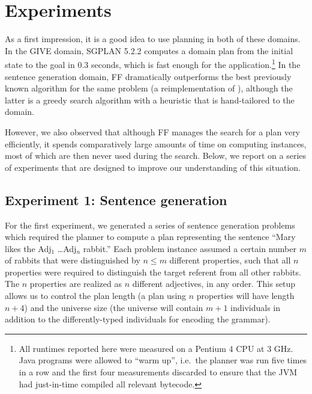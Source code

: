 \section{Experiments} \label{sec:experiments}

As a first impression, it is a good idea to use planning in both of
these domains.  In the GIVE domain, SGPLAN 5.2.2 computes a domain
plan from the initial state to the goal in 0.3 seconds, which is fast
enough for the application.\footnote{All runtimes reported here were
  measured on a Pentium 4 CPU at 3 GHz.  Java programs were allowed to
  ``warm up'', i.e.\ the planner was run five times in a row and the
  first four measurements discarded to ensure that the JVM had
  just-in-time compiled all relevant bytecode.}  In the sentence
generation domain, FF dramatically outperforms the best previously
known algorithm for the same problem (a reimplementation of
\cite{Stone2003a}), although the latter is a greedy search algorithm
with a heuristic that is hand-tailored to the domain.

However, we also observed that although FF manages the search for a
plan very efficiently, it spends comparatively large amounts of time
on computing instances, most of which are then never used during the
search.  Below, we report on a series of experiments that are designed
to improve our understanding of this situation.

\subsection{Experiment 1: Sentence generation}
\label{sec:exper-1:-sent}

For the first experiment, we generated a series of sentence generation
problems which required the planner to compute a plan representing the
sentence ``Mary likes the Adj$_1$ \ldots Adj$_n$ rabbit.''  Each
problem instance assumed a certain number $m$ of rabbits that were
distinguished by $n \leq m$ different properties, such that all $n$
properties were required to distinguish the target referent from all
other rabbits.  The $n$ properties are realized as $n$ different
adjectives, in any order.  This setup allows us to control the plan
length (a plan using $n$ properties will have length $n+4$) and the
universe size (the universe will contain $m+1$ individuals in addition
to the differently-typed individuals for encoding the grammar).

